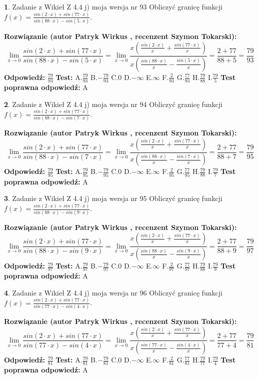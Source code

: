 \documentclass[12pt, a4paper]{article}
\theoremstyle{definition} %
\newtheorem{zad}{}
\newcommand{\zadStart}[1]{\begin{zad}#1\newline}
\newcommand{\zadStop}{\end{zad}}
\newcommand{\rozwStart}[2]{\noindent \textbf{Rozwiązanie (autor #1 , recenzent #2): }\newline}
\newcommand{\rozwStop}{\newline}
\newcommand{\odpStart}{\noindent \textbf{Odpowiedź:}\newline}
\newcommand{\odpStop}{\newline}
\newcommand{\testStart}{\noindent \textbf{Test:}\newline}
\newcommand{\testStop}{\newline}
\newcommand{\kluczStart}{\noindent \textbf{Test poprawna odpowiedź:}\newline}
\newcommand{\kluczStop}{\newline}
\begin{document}
\zadStart{Zadanie z Wikieł Z 4.4 j) moja wersja nr 93}
Obliczyć granicę funkcji $f(x)=\frac{sin(2\cdot x) +sin(77\cdot x)}{sin(88\cdot x) -sin(5\cdot x)}$.
\zadStop
\rozwStart{Patryk Wirkus}{Szymon Tokarski}
$$\lim\limits_{x\to 0}\frac{sin(2\cdot x) +sin(77\cdot x)}{sin(88\cdot x) -sin(5\cdot x)}=\lim\limits_{x\to 0}\frac{x(\frac{sin(2\cdot x)}{x}+\frac{sin(77\cdot x)}{x})}{x(\frac{sin(88\cdot x)}{x}-\frac{sin(5\cdot x)}{x})}=\frac{2+77}{88+5} = \frac{79}{93}$$
\rozwStop
\odpStart
$\frac{79}{93}$
\odpStop
\testStart
A.$\frac{79}{93}$
B.$-\frac{79}{93}$
C.$0$
D.$-\infty$
E.$\infty$
F.$\frac{2}{93}$
G.$\frac{77}{93}$
H.$\frac{79}{88}$
I.$\frac{79}{5}$
\testStop
\kluczStart
A
\kluczStop



\zadStart{Zadanie z Wikieł Z 4.4 j) moja wersja nr 94}
Obliczyć granicę funkcji $f(x)=\frac{sin(2\cdot x) +sin(77\cdot x)}{sin(88\cdot x) -sin(7\cdot x)}$.
\zadStop
\rozwStart{Patryk Wirkus}{Szymon Tokarski}
$$\lim\limits_{x\to 0}\frac{sin(2\cdot x) +sin(77\cdot x)}{sin(88\cdot x) -sin(7\cdot x)}=\lim\limits_{x\to 0}\frac{x(\frac{sin(2\cdot x)}{x}+\frac{sin(77\cdot x)}{x})}{x(\frac{sin(88\cdot x)}{x}-\frac{sin(7\cdot x)}{x})}=\frac{2+77}{88+7} = \frac{79}{95}$$
\rozwStop
\odpStart
$\frac{79}{95}$
\odpStop
\testStart
A.$\frac{79}{95}$
B.$-\frac{79}{95}$
C.$0$
D.$-\infty$
E.$\infty$
F.$\frac{2}{95}$
G.$\frac{77}{95}$
H.$\frac{79}{88}$
I.$\frac{79}{7}$
\testStop
\kluczStart
A
\kluczStop



\zadStart{Zadanie z Wikieł Z 4.4 j) moja wersja nr 95}
Obliczyć granicę funkcji $f(x)=\frac{sin(2\cdot x) +sin(77\cdot x)}{sin(88\cdot x) -sin(9\cdot x)}$.
\zadStop
\rozwStart{Patryk Wirkus}{Szymon Tokarski}
$$\lim\limits_{x\to 0}\frac{sin(2\cdot x) +sin(77\cdot x)}{sin(88\cdot x) -sin(9\cdot x)}=\lim\limits_{x\to 0}\frac{x(\frac{sin(2\cdot x)}{x}+\frac{sin(77\cdot x)}{x})}{x(\frac{sin(88\cdot x)}{x}-\frac{sin(9\cdot x)}{x})}=\frac{2+77}{88+9} = \frac{79}{97}$$
\rozwStop
\odpStart
$\frac{79}{97}$
\odpStop
\testStart
A.$\frac{79}{97}$
B.$-\frac{79}{97}$
C.$0$
D.$-\infty$
E.$\infty$
F.$\frac{2}{97}$
G.$\frac{77}{97}$
H.$\frac{79}{88}$
I.$\frac{79}{9}$
\testStop
\kluczStart
A
\kluczStop



\zadStart{Zadanie z Wikieł Z 4.4 j) moja wersja nr 96}
Obliczyć granicę funkcji $f(x)=\frac{sin(2\cdot x) +sin(77\cdot x)}{sin(77\cdot x) -sin(4\cdot x)}$.
\zadStop
\rozwStart{Patryk Wirkus}{Szymon Tokarski}
$$\lim\limits_{x\to 0}\frac{sin(2\cdot x) +sin(77\cdot x)}{sin(77\cdot x) -sin(4\cdot x)}=\lim\limits_{x\to 0}\frac{x(\frac{sin(2\cdot x)}{x}+\frac{sin(77\cdot x)}{x})}{x(\frac{sin(77\cdot x)}{x}-\frac{sin(4\cdot x)}{x})}=\frac{2+77}{77+4} = \frac{79}{81}$$
\rozwStop
\odpStart
$\frac{79}{81}$
\odpStop
\testStart
A.$\frac{79}{81}$
B.$-\frac{79}{81}$
C.$0$
D.$-\infty$
E.$\infty$
F.$\frac{2}{81}$
G.$\frac{77}{81}$
H.$\frac{79}{77}$
I.$\frac{79}{4}$
\testStop
\kluczStart
A
\kluczStop
\end{document}
